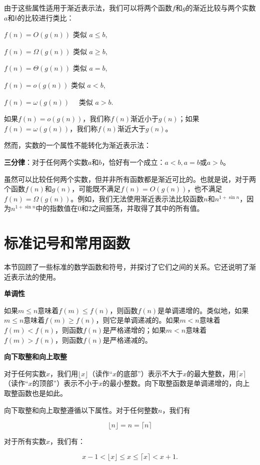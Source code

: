 \documentclass[lang=cn,newtx,10pt,scheme=chinese]{elegantbook}
\begin{document}
由于这些属性适用于渐近表示法，我们可以将两个函数$f$和$g$的渐近比较与两个实数$a$和$b$的比较进行类比：

$f(n)=O(g(n))$ 类似 $a \leq b$,

$f(n)=\Omega(g(n))$ 类似 $a \geq b$,

$f(n)=\Theta(g(n))$ 类似 $a=b$,

$f(n)=o(g(n))$ 类似 $a<b$,

$f(n)=\omega(g(n)) \quad$ 类似 $a>b$.

如果$f(n)=o(g(n))$，我们称$f(n)$渐近小于$g(n)$；如果$f(n)=\omega(g(n))$，我们称$f(n)$渐近大于$g(n)$。

然而，实数的一个属性不能转化为渐近表示法：

\textbf{三分律}：对于任何两个实数$a$和$b$，恰好有一个成立：$a<b, a=b$或$a>b$。

虽然可以比较任何两个实数，但并非所有函数都是渐近可比的。也就是说，对于两个函数$f(n)$和$g(n)$，可能既不满足$f(n)=O(g(n))$，也不满足$f(n)=\Omega(g(n))$。例如，我们无法使用渐近表示法比较函数$n$和$n^{1+\sin n}$，因为$n^{1+\sin n}$中的指数值在0和2之间振荡，并取得了其中的所有值。

\section{标准记号和常用函数}\label{section-3.3}

本节回顾了一些标准的数学函数和符号，并探讨了它们之间的关系。它还说明了渐近表示法的使用。

\textbf{单调性}

如果$m\leq n$意味着$f(m)\leq f(n)$，则函数$f(n)$是单调递增的。类似地，如果$m\leq n$意味着$f(m)\geq f(n)$，则它是单调递减的。如果$m<n$意味着$f(m)<f(n)$，则函数$f(n)$是严格递增的；如果$m<n$意味着$f(m)>f(n)$，则函数$f(n)$是严格递减的。

\textbf{向下取整和向上取整}

对于任何实数$x$，我们用$\lfloor x\rfloor$（读作“$x$的底部”）表示不大于$x$的最大整数，用$\lceil x\rceil$（读作“$x$的顶部”）表示不小于$x$的最小整数。向下取整函数是单调递增的，向上取整函数也是如此。

向下取整和向上取整遵循以下属性。对于任何整数$n$，我们有

\begin{equation}
\lfloor n\rfloor=n=\lceil n\rceil
\end{equation}

对于所有实数$x$，我们有：

\begin{equation}
x-1<\lfloor x\rfloor \leq x \leq\lceil x\rceil<x+1 .
\end{equation}
\end{document}
